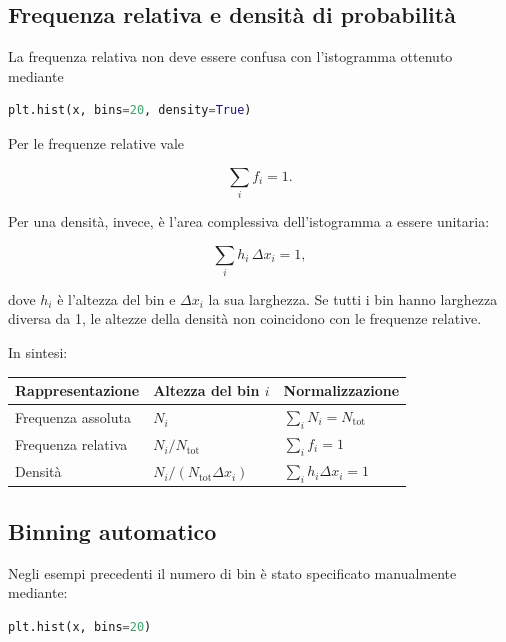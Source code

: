 \documentclass[11pt,a4paper]{book}
\begin{document}
\subsection{Frequenza relativa e densità di probabilità}

La frequenza relativa non deve essere confusa con l'istogramma ottenuto
mediante

\begin{lstlisting}[language=Python]
plt.hist(x, bins=20, density=True)
\end{lstlisting}

Per le frequenze relative vale

\begin{equation}
\sum_i f_i=1.
\end{equation}

Per una densità, invece, è l'area complessiva dell'istogramma a essere
unitaria:

\begin{equation}
\sum_i h_i\,\Delta x_i=1,
\end{equation}

dove $h_i$ è l'altezza del bin e $\Delta x_i$ la sua larghezza. Se tutti
i bin hanno larghezza diversa da 1, le altezze della densità non
coincidono con le frequenze relative.

In sintesi:

\begin{center}
\begin{tabular}{lll}
\toprule
Rappresentazione & Altezza del bin $i$ & Normalizzazione \\
\midrule
Frequenza assoluta & $N_i$ & $\sum_i N_i=N_{\mathrm{tot}}$ \\
Frequenza relativa & $N_i/N_{\mathrm{tot}}$ & $\sum_i f_i=1$ \\
Densità & $N_i/(N_{\mathrm{tot}}\Delta x_i)$ &
$\sum_i h_i\Delta x_i=1$ \\
\bottomrule
\end{tabular}
\end{center}

\subsection{Binning automatico}

Negli esempi precedenti il numero di bin è stato specificato
manualmente mediante:

\begin{lstlisting}[language=Python]
plt.hist(x, bins=20)
\end{lstlisting}
\end{document}
